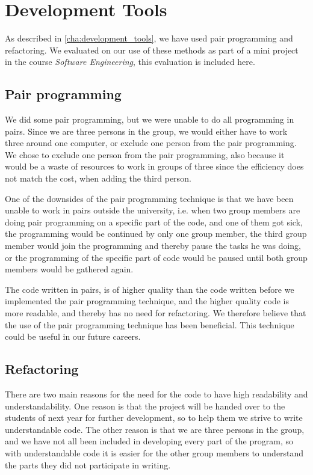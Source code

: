 \section{Development Tools}
As described in \autoref{cha:development_tools}, we have used pair programming and refactoring. We evaluated on our use of these methods as part of a mini project in the course \textit{Software Engineering}, this evaluation is included here.

\subsection{Pair programming}
We did some pair programming, but we were unable to do all programming in pairs. Since we are three persons in the group, we would either have to work three around one computer, or exclude one person from the pair programming. We chose to exclude one person from the pair programming, also because it would be a waste of resources to work in groups of three since the efficiency does not match the cost, when adding the third person.

One of the downsides of the pair programming technique is that we have been unable to work in pairs outside the university, i.e. when two group members are doing pair programming on a specific part of the code, and one of them got sick, the programming would be continued by only one group member, the third group member would join the programming and thereby pause the tasks he was doing, or the programming of the specific part of code would be paused until both group members would be gathered again.

The code written in pairs, is of higher quality than the code written before we implemented the pair programming technique, and the higher quality code is more readable, and thereby has no need for refactoring. We therefore believe that the use of the pair programming technique has been beneficial. This technique could be useful in our future careers.

\subsection{Refactoring}
There are two main reasons for the need for the code to have high readability and understandability. One reason is that the project will be handed over to the students of next year for further development, so to help them we strive to write understandable code. The other reason is that we are three persons in the group, and we have not all been included in developing every part of the program, so with understandable code it is easier for the other group members to understand the parts they did not participate in writing.

